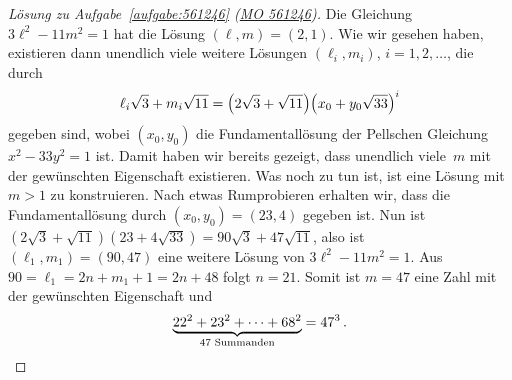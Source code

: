 \begin{proof}[Lösung zu Aufgabe~\ref{aufgabe:561246} \textmd{(\href{https://www.mathematik-olympiaden.de/moev/index.php?option=com_download&thema=a&datei=A56124b.pdf&format=raw}{MO 561246})}]
	Die Gleichung $3\ell^2-11m^2=1$ hat die Lösung $(\ell,m)=(2,1)$. Wie wir gesehen haben, existieren dann unendlich viele weitere Lösungen $(\ell_i,m_i)$, $i=1,2,\dotsc$, die durch
	\begin{equation*}
		\ell_i\sqrt{3}+m_i\sqrt{11}=\parens*{2\sqrt{3}+\sqrt{11}}\parens*{x_0+y_0\sqrt{33}}^i
	\end{equation*}
	gegeben sind, wobei $(x_0,y_0)$ die Fundamentallösung der Pellschen Gleichung $x^2-33y^2=1$ ist. Damit haben wir bereits gezeigt, dass unendlich viele~$m$ mit der gewünschten Eigenschaft existieren. Was noch zu tun ist, ist eine Lösung mit $m>1$ zu konstruieren. Nach etwas Rumprobieren erhalten wir, dass die Fundamentallösung durch $(x_0,y_0)=(23,4)$ gegeben ist. Nun ist $(2\sqrt{3}+\sqrt{11})(23+4\sqrt{33})=90\sqrt{3}+47\sqrt{11}$, also ist $(\ell_1,m_1)=(90,47)$ eine weitere Lösung von $3\ell^2-11m^2=1$. Aus $90=\ell_1=2n+m_1+1=2n+48$ folgt $n=21$. Somit ist $m=47$ eine Zahl mit der gewünschten Eigenschaft und
	\begin{equation*}
		\underbrace{22^2+23^2+\dotsb+68^2}_{\text{$47$ Summanden}}=47^3\,.\qedhere
	\end{equation*}
\end{proof}

